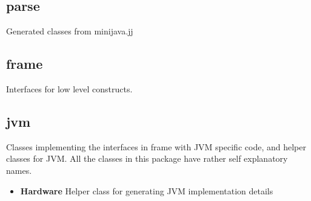 \documentclass[a4paper,11pt]{article}
\begin{document}
  \subsection{parse}
     Generated classes from minijava.jj
  \subsection{frame}
     Interfaces for low level constructs.
  \subsection{jvm}
     Classes implementing the interfaces in frame with JVM specific code, and helper classes for JVM. All the classes in this package have rather self explanatory names.
     \begin{itemize}
        \item \textbf{Hardware} Helper class for generating JVM implementation details
     \end{itemize}
\end{document}
